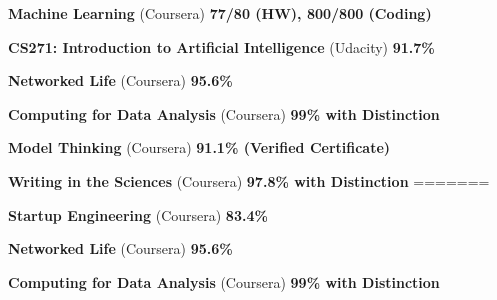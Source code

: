 \documentclass[margin,line]{resume}
\begin{document}
\begin{resume}
    \begin{list2}
	\item \textbf{Machine Learning} (Coursera) \hspace{54mm} \textbf{77/80 (HW), 800/800 (Coding)}
	\end{list2}
    
    \begin{list2}
	\item \textbf{CS271: Introduction to Artificial Intelligence} (Udacity) \hspace{52mm} \textbf{91.7\%}
	\end{list2}

    \begin{list2}
	\item \textbf{Networked Life} (Coursera) \hspace{104mm} \textbf{95.6\%}
	\end{list2}
    
    \begin{list2}
	\item \textbf{Computing for Data Analysis} (Coursera) \hspace{52mm} \textbf{99\% with Distinction}
	\end{list2}

	\begin{list2}
    \item \textbf{Model Thinking} (Coursera) \hspace{65mm} \textbf{91.1\% (Verified Certificate)}
    \end{list2}

    \begin{list2}
	\item \textbf{Writing in the Sciences} (Coursera) \hspace{60mm} \textbf{97.8\% with Distinction}
=======
	\item \textbf{Startup Engineering} (Coursera) \hspace{94mm} \textbf{83.4\%}
	\end{list2}

    \begin{list2}
	\item \textbf{Networked Life} (Coursera) \hspace{104mm} \textbf{95.6\%}
	\end{list2}
    
    \begin{list2}
	\item \textbf{Computing for Data Analysis} (Coursera) \hspace{52mm} \textbf{99\% with Distinction}
	\end{list2}


\end{resume}
\end{document}
